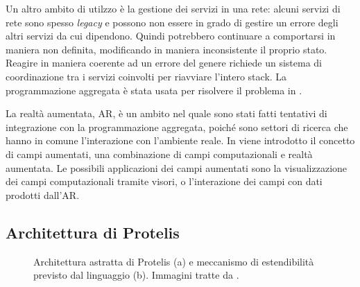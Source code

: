 Un altro ambito di utilzzo è la gestione dei servizi in una rete:
alcuni servizi di rete sono spesso \textit{legacy} e possono non essere in
grado di gestire un errore degli altri servizi da cui dipendono. Quindi
potrebbero continuare a comportarsi in maniera non definita, modificando in
maniera inconsistente il proprio stato. Reagire in maniera coerente ad un errore
del genere richiede un sistema di coordinazione tra i servizi coinvolti per
riavviare l'intero stack. La programmazione aggregata è stata usata per
risolvere il problema in \cite{7306601}.

La realtà aumentata, AR, è un ambito nel quale sono stati fatti tentativi di
integrazione con la programmazione aggregata, poiché sono settori di ricerca che
hanno in comune l'interazione con l'ambiente reale. In \cite{7306561} viene
introdotto il concetto di campi aumentati, una combinazione di campi
computazionali e realtà aumentata. Le possibili applicazioni dei campi aumentati
sono la visualizzazione dei campi computazionali tramite visori, o l'interazione
dei campi con dati prodotti dall'AR.

\subsection{Architettura di Protelis}\label{subsec:Architettura di Protelis}
\begin{figure}
  \hfill
  \caption{Architettura astratta di Protelis (a) e meccanismo di estendibilità
    previsto dal linguaggio (b). Immagini tratte da \cite{Protelis}.}
\end{figure}

